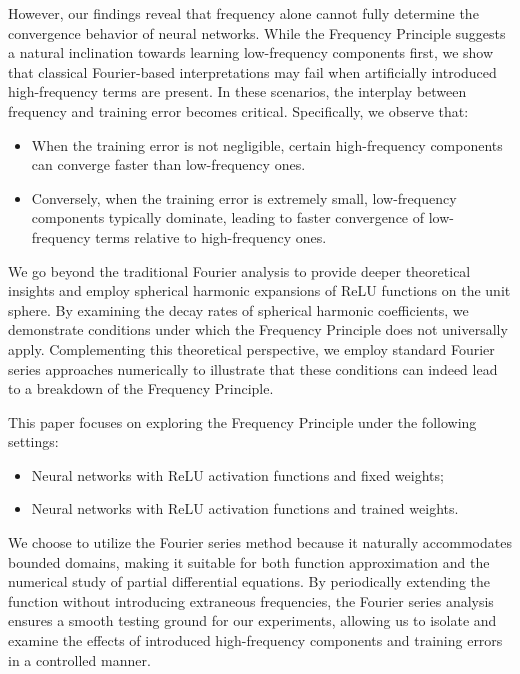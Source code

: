 \documentclass[review,onefignum,onetabnum,onealgnum]{siamart250106}
\numberwithin{theorem}{section}
\begin{document}
However, our findings reveal that frequency alone cannot fully determine the convergence behavior of neural networks. While the Frequency Principle suggests a natural inclination towards learning low-frequency components first, we show that classical Fourier-based interpretations may fail when artificially introduced high-frequency terms are present. In these scenarios, the interplay between frequency and training error becomes critical. Specifically, we observe that:
\begin{itemize}
    \item When the training error is not negligible, certain high-frequency components can converge faster than low-frequency ones.
    \item Conversely, when the training error is extremely small, low-frequency components typically dominate, leading to faster convergence of low-frequency terms relative to high-frequency ones.
\end{itemize}

We go beyond the traditional Fourier analysis to provide deeper theoretical insights and employ spherical harmonic expansions of ReLU functions on the unit sphere. By examining the decay rates of spherical harmonic coefficients, we demonstrate conditions under which the Frequency Principle does not universally apply. Complementing this theoretical perspective, we employ standard Fourier series approaches numerically to illustrate that these conditions can indeed lead to a breakdown of the Frequency Principle.

This paper focuses on exploring the Frequency Principle under the following settings:
\begin{itemize}
\item Neural networks with ReLU activation functions and fixed weights;
\item Neural networks with ReLU activation functions and trained weights.
\end{itemize}

We choose to utilize the Fourier series method because it naturally accommodates bounded domains, making it suitable for both function approximation and the numerical study of partial differential equations. By periodically extending the function without introducing extraneous frequencies, the Fourier series analysis ensures a smooth testing ground for our experiments, allowing us to isolate and examine the effects of introduced high-frequency components and training errors in a controlled manner.
\end{document}
